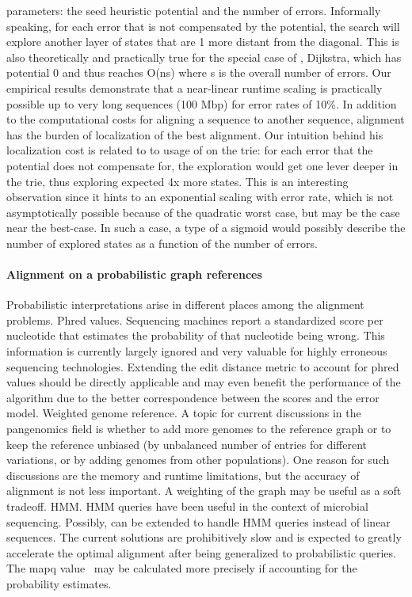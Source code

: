 parameters: the seed heuristic potential and the number of errors. Informally
speaking, for each error that is not compensated by the potential, the \A search
will explore another layer of states that are 1 more distant from the diagonal.
This is also theoretically and practically true for the special case of \A,
Dijkstra, which has potential 0 and thus reaches O(ns) where s is the overall
number of errors. Our empirical results demonstrate that a near-linear runtime
scaling is practically possible up to very long sequences (100 Mbp) for error
rates of 10\%. In addition to the computational costs for aligning a sequence to
another sequence, alignment has the burden of localization of the best
alignment. Our intuition behind his localization cost is related to to usage of
\A on the trie: for each error that the \A potential does not compensate for,
the exploration would get one lever deeper in the trie, thus exploring expected
4x more states. This is an interesting observation since it hints to an
exponential scaling with error rate, which is not asymptotically possible
because of the quadratic worst case, but may be the case near the best-case. In
such a case, a type of a sigmoid would possibly describe the number of explored
states as a function of the number of errors.

\paragraph{Alignment on a probabilistic graph references}
Probabilistic interpretations arise in different places among the alignment
problems. Phred values. Sequencing machines report a standardized score per
nucleotide that estimates the probability of that nucleotide being wrong. This
information is currently largely ignored and very valuable for highly erroneous
sequencing technologies. Extending the edit distance metric to account for phred
values should be directly applicable and may even benefit the performance of the
\A algorithm due to the better correspondence between the scores and the error
model. Weighted genome reference. A topic for current discussions in the
pangenomics field is whether to add more genomes to the reference graph or to
keep the reference unbiased (by unbalanced number of entries for different
variations, or by adding genomes from other populations). One reason for such
discussions are the memory and runtime limitations, but the accuracy of
alignment is not less important. A weighting of the graph may be useful as a
soft tradeoff. HMM. HMM queries have been useful in the context of microbial
sequencing. Possibly, \A can be extended to handle HMM queries instead of linear
sequences. The current solutions are prohibitively slow and \astarix is expected
to greatly accelerate the optimal alignment after being generalized to
probabilistic queries. The mapq value~\citep{li2008mapping} may be calculated
more precisely if accounting for the probability estimates.

